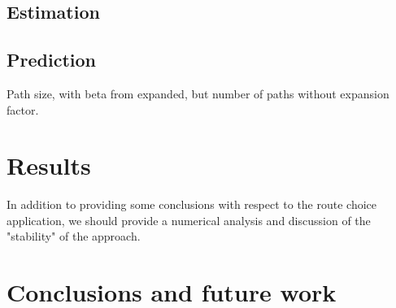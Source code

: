 \documentclass[12pt,a4paper]{article}
\begin{document}
\subsection{Estimation}
\subsection{Prediction}
Path size, with beta from expanded, but number of paths without expansion factor.

\section{Results} \label{sec:results}
In addition to providing some conclusions with respect to the route choice application, we should provide a numerical analysis and discussion of the "stability" of the approach.

\section{Conclusions and future work} \label{sec:conclusions}




\end{document}
